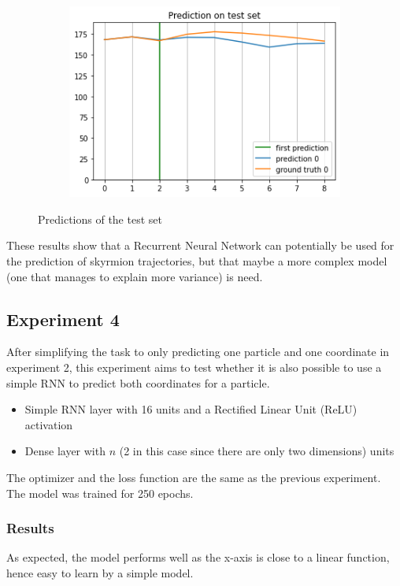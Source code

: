 \documentclass[a4paper]{article}
\begin{document}
\begin{figure}
\begin{subfigure}{\linewidth}
    \end{subfigure}\par\medskip
    \begin{subfigure}{\linewidth}
      \begin{center}
        \includegraphics[width=.45\linewidth]{rnn3_test_5.png}
      \end{center}
    \end{subfigure}\par\medskip
    \caption{Predictions of the test set}
    \label{fig:rnn3_test}  
  \end{figure}

  These results show that a Recurrent Neural Network can potentially be used for the prediction of skyrmion trajectories, but that maybe a more complex model (one that manages to explain more variance) is need.

  \subsection{Experiment 4}
  After simplifying the task to only predicting one particle and one coordinate in experiment 2, this experiment aims to test whether it is also possible to use a simple RNN to predict both coordinates for a particle. 

  \begin{itemize}
    \item Simple RNN layer with 16 units and a Rectified Linear Unit (ReLU) activation
    \item Dense layer with $n$ (2 in this case since there are only two dimensions) units
  \end{itemize}

  The optimizer and the loss function are the same as the previous experiment. The model was trained for 250 epochs.

  \subsubsection{Results}
  As expected, the model performs well as the x-axis is close to a linear function, hence easy to learn by a simple model.
\end{document}
